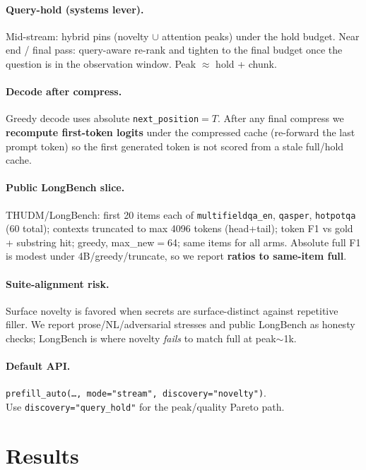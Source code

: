 \documentclass[11pt,a4paper]{article}
\begin{document}
\paragraph{Query-hold (systems lever).}
Mid-stream: hybrid pins (novelty $\cup$ attention peaks) under the hold budget. Near end / final pass: query-aware re-rank and tighten to the final budget once the question is in the observation window. Peak $\approx$ hold + chunk.

\paragraph{Decode after compress.}
Greedy decode uses absolute \texttt{next\_position}$=T$. After any final compress we \textbf{recompute first-token logits} under the compressed cache (re-forward the last prompt token) so the first generated token is not scored from a stale full/hold cache.

\paragraph{Public LongBench slice.}
THUDM/LongBench: first 20 items each of \texttt{multifieldqa\_en}, \texttt{qasper}, \texttt{hotpotqa} (60 total); contexts truncated to max 4096 tokens (head+tail); token F1 vs gold + substring hit; greedy, max\_new$=$64; same items for all arms. Absolute full F1 is modest under 4B/greedy/truncate, so we report \textbf{ratios to same-item full}.

\paragraph{Suite-alignment risk.}
Surface novelty is favored when secrets are surface-distinct against repetitive filler. We report prose/NL/adversarial stresses and public LongBench as honesty checks; LongBench is where novelty \emph{fails} to match full at peak$\sim$1k.

\paragraph{Default API.}
\texttt{prefill\_auto(\ldots, mode="stream", discovery="novelty")}.\\
Use \texttt{discovery="query\_hold"} for the peak/quality Pareto path.

\section{Results}
\end{document}
